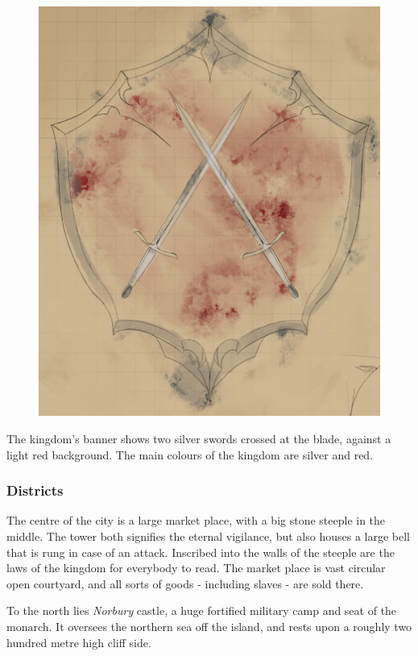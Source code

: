 \begin{figure}[!ht]
  \centering
  \includegraphics[width=0.9\linewidth]{media/norbury-bannersm.png}
\end{figure}

The kingdom's banner shows two silver swords crossed at the blade, against a
light red background. The main colours of the kingdom are silver and red.

\subsubsection{Districts}

The centre of the city is a large market place, with a big stone steeple in
the middle. The tower both signifies the eternal vigilance, but also houses a
large bell that is rung in case of an attack. Inscribed into the walls of
the steeple are the laws of the kingdom for everybody to read. The market
place is vast circular open courtyard, and all sorts of goods - including
slaves - are sold there.

To the north lies \emph{Norbury} castle, a huge fortified military camp and
seat of the monarch. It oversees the northern sea off the island, and rests
upon a roughly two hundred metre high cliff side.

